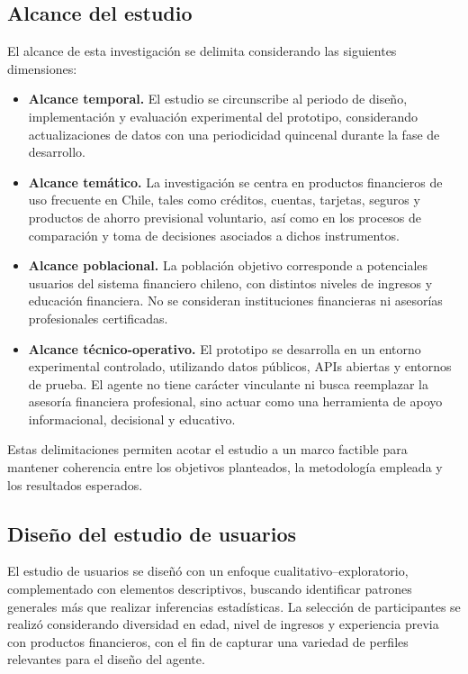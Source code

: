 \documentclass[
	spanish, %
	letterpaper, oneside
]{book}
\begin{document}
\begin{itemize}
\subsection{Alcance del estudio}

El alcance de esta investigación se delimita considerando las siguientes dimensiones:

\begin{itemize}
    \item \textbf{Alcance temporal.}  
    El estudio se circunscribe al periodo de diseño, implementación y evaluación experimental del prototipo, considerando actualizaciones de datos con una periodicidad quincenal durante la fase de desarrollo.
    
    \item \textbf{Alcance temático.}  
    La investigación se centra en productos financieros de uso frecuente en Chile, tales como créditos, cuentas, tarjetas, seguros y productos de ahorro previsional voluntario, así como en los procesos de comparación y toma de decisiones asociados a dichos instrumentos.
    
    \item \textbf{Alcance poblacional.}  
    La población objetivo corresponde a potenciales usuarios del sistema financiero chileno, con distintos niveles de ingresos y educación financiera. No se consideran instituciones financieras ni asesorías profesionales certificadas.
    
    \item \textbf{Alcance técnico-operativo.}  
    El prototipo se desarrolla en un entorno experimental controlado, utilizando datos públicos, APIs abiertas y entornos de prueba. El agente no tiene carácter vinculante ni busca reemplazar la asesoría financiera profesional, sino actuar como una herramienta de apoyo informacional, decisional y educativo.
\end{itemize}

Estas delimitaciones permiten acotar el estudio a un marco factible para mantener coherencia entre los objetivos planteados, la metodología empleada y los resultados esperados.


\subsection{Diseño del estudio de usuarios}

El estudio de usuarios se diseñó con un enfoque cualitativo–exploratorio, complementado con elementos descriptivos, buscando identificar patrones generales más que realizar inferencias estadísticas. La selección de participantes se realizó considerando diversidad en edad, nivel de ingresos y experiencia previa con productos financieros, con el fin de capturar una variedad de perfiles relevantes para el diseño del agente.


\end{itemize}
\end{document}
